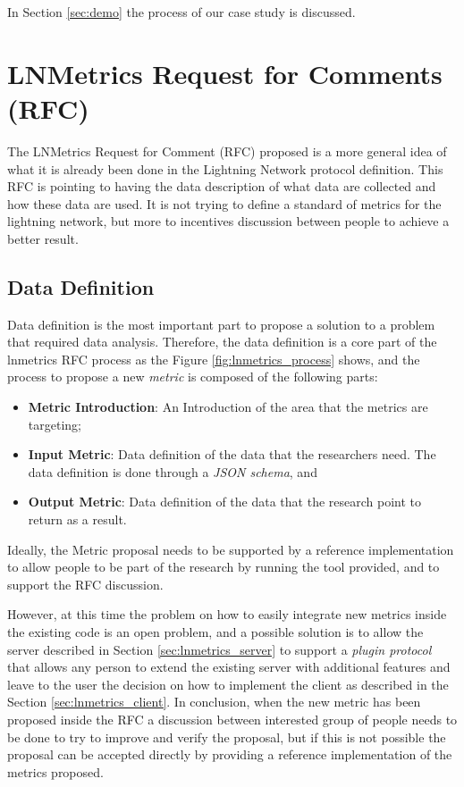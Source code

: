 In Section \ref{sec:demo} the process of our case study is discussed.

\section{LNMetrics Request for Comments (RFC)}

The LNMetrics Request for Comment (RFC) proposed is a more general idea of what 
it is already been done in the Lightning Network protocol definition. 
This RFC is pointing to having the data description of what data are collected 
and how these data are used. It is not trying to define a 
standard of metrics for the lightning network, 
but more to incentives discussion between people to achieve a better result.

\subsection{Data Definition}

Data definition is the most important part to propose a solution to a problem 
that required data analysis. Therefore, the data definition is a core 
part of the lnmetrics RFC process as the Figure \ref{fig:lnmetrics_process}
shows, and the process to propose a new \emph{metric} is composed of 
the following parts:

\begin{itemize}
    \item {\bf Metric Introduction}: An Introduction of the area that the metrics are targeting;
    \item {\bf Input Metric}: Data definition of the data that the researchers need. The data definition is done through a \emph{JSON schema}, and
    \item {\bf Output Metric}: Data definition of the data that the research point to return as a result. 
\end{itemize}

Ideally, the Metric proposal needs to be supported by a reference implementation to 
allow people to be part of the research by running the tool provided, and 
to support the RFC discussion.

However, at this time the problem on how to easily integrate new metrics inside the 
existing code is an open problem, and a possible solution is to allow the server 
described in Section \ref{sec:lnmetrics_server} to support a \emph{plugin protocol}
that allows any person to extend the existing server with additional features and leave to the user 
the decision on how to implement the client as described in the Section \ref{sec:lnmetrics_client}.
In conclusion, when the new metric has been proposed inside the RFC a discussion between interested 
group of people needs to be done to try to improve and verify the proposal, but if this is not possible
the proposal can be accepted directly by providing a reference implementation of the metrics proposed.

